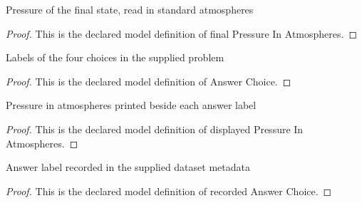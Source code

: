 \begin{definition}
  \label{def:physics:phyx-mini-0476:phyxminiproblems-problemphyxmini0476-finalpressureinatmospheres}
  Pressure of the final state, read in standard atmospheres
\end{definition}
\begin{proof}
  This is the declared model definition of final Pressure In Atmospheres.
\end{proof}
\begin{definition}
  \label{def:physics:phyx-mini-0476:phyxminiproblems-problemphyxmini0476-answerchoice}
  Labels of the four choices in the supplied problem
\end{definition}
\begin{proof}
  This is the declared model definition of Answer Choice.
\end{proof}
\begin{definition}
  \label{def:physics:phyx-mini-0476:phyxminiproblems-problemphyxmini0476-displayedpressureinatmospheres}
  Pressure in atmospheres printed beside each answer label
\end{definition}
\begin{proof}
  This is the declared model definition of displayed Pressure In Atmospheres.
\end{proof}
\begin{definition}
  \label{def:physics:phyx-mini-0476:phyxminiproblems-problemphyxmini0476-recordedanswerchoice}
  Answer label recorded in the supplied dataset metadata
\end{definition}
\begin{proof}
  This is the declared model definition of recorded Answer Choice.
\end{proof}

